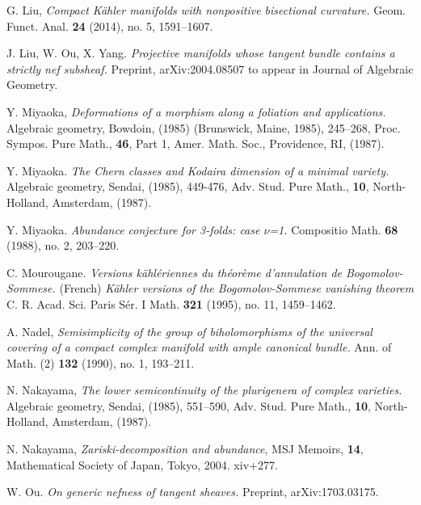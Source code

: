 \documentclass[12pt]{amsart}
\theoremstyle{definition}
\theoremstyle{remark}
\begin{document}
\begin{thebibliography}{n}
G. Liu,
\textit{Compact K\"ahler manifolds with nonpositive bisectional curvature.}
 Geom. Funct. Anal.  {\bf 24}  (2014),  no. 5, 1591--1607.
 



J. Liu, W. Ou, X. Yang. \textit{Projective manifolds whose tangent bundle contains a strictly nef subsheaf.} Preprint, arXiv:2004.08507
to appear in Journal of Algebraic Geometry.

 
 Y. Miyaoka, 
 \textit{Deformations of a morphism along a foliation and applications.}
 Algebraic geometry, Bowdoin, (1985)  (Brunswick, Maine, 1985), 
 245--268, Proc. Sympos. Pure Math., {\bf{46}}, Part 1, Amer. Math. Soc., Providence, RI,  (1987). 
 
Y. Miyaoka. 
\textit{The Chern classes and Kodaira dimension of a minimal variety.}
 Algebraic geometry, Sendai, (1985), 
 449-476, Adv. Stud. Pure Math., {\bf 10}, North-Holland, Amsterdam, (1987). 
 
 Y. Miyaoka. 
\textit{Abundance conjecture for 3-folds: case $\nu$=1.}
 Compositio Math.  {\bf{68}}  (1988),  no. 2, 203--220.
 
 

C. Mourougane. \textit{Versions k\"ahl\'eriennes du th\'eor\`eme d'annulation de Bogomolov-Sommese.} (French) \textit{K\"ahler versions of the Bogomolov-Sommese vanishing theorem} C. R. Acad. Sci. Paris S\'er. I Math. {\bf{321}} (1995), no. 11, 1459--1462.

 
 

A. Nadel, 
\textit{Semisimplicity of the group of biholomorphisms of the universal covering of a compact complex manifold with ample canonical bundle.}
 Ann. of Math. (2)  {\bf{132}}  (1990),  no. 1, 193--211.



  N. Nakayama, 
  \textit{The lower semicontinuity of the plurigenera of complex varieties.}
 Algebraic geometry, Sendai, (1985), 
 551--590, Adv. Stud. Pure Math., {\bf{10}}, North-Holland, Amsterdam,  (1987). 
 
 
N. Nakayama, 
\textit{Zariski-decomposition and abundance}, 
MSJ Memoirs, {\bf{14}},  Mathematical Society of Japan, Tokyo, 2004. 
xiv+277.




W. Ou. 
\textit{On generic nefness of tangent sheaves.}
Preprint, arXiv:1703.03175.



\end{thebibliography}
\end{document}

